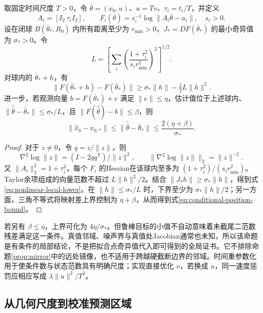 \begin{proposition}[含曲率条件的局部非线性误差界]
\label{prop:local-bound}
取固定时间尺度 $T>0$，令 $\bar\theta=(x_0,u)$、$u=Tv$、$\tau_i=t_i/T$，并定义
\[
 A_i=[I_2\ \tau_i I_2],\qquad
 F_i(\bar\theta)=s_i^{-1}\log\|A_i\bar\theta-a_i\|,
 \quad s_i>0.
\]
设在闭球 $B(\bar\theta_*,R_0)$ 内所有距离至少为 $r_{\min}>0$，$J_*=DF(\bar\theta_*)$ 的最小奇异值为 $\sigma_*>0$。令
\begin{equation}
 L=\left[\sum_i\left(\frac{1+\tau_i^2}{s_i r_{\min}^2}\right)^2\right]^{1/2}.
\end{equation}
对球内的 $\bar\theta_*+h$，有
\begin{equation}
 \|F(\bar\theta_*+h)-F(\bar\theta_*)\|
 \geq\sigma_*\|h\|-\tfrac12L\|h\|^2.
 \label{eq:nonlinear-local-lower}
\end{equation}
进一步，若观测向量 $b=F(\bar\theta_*)+e$ 满足 $\|e\|\leq\eta$，估计值位于上述球内、$\|\widehat{\bar\theta}-\bar\theta_*\|\leq\sigma_*/L$，且 $\|F(\widehat{\bar\theta})-b\|\leq\beta$，则
\begin{equation}
 \|\widehat x_0-x_{0,*}\|
 \leq\|\widehat{\bar\theta}-\bar\theta_*\|
 \leq\frac{2(\eta+\beta)}{\sigma_*}.
 \label{eq:conditional-position-bound}
\end{equation}
\end{proposition}

\begin{proof}
对于 $z\ne0$，令 $q=z/\|z\|$，则
\[
 \nabla^2\log\|z\|=(I-2qq^{\mathsf T})/\|z\|^2,
 \qquad \|\nabla^2\log\|z\|\|_2=\|z\|^{-2}.
\]
又 $\|A_i\|_2^2=1+\tau_i^2$，每个 $F_i$ 的Hessian在该球内至多为 $(1+\tau_i^2)/(s_i r_{\min}^2)$。Taylor余项组成的向量范数不超过 $L\|h\|^2/2$。结合 $\|J_*h\|\geq\sigma_*\|h\|$，得到式\eqref{eq:nonlinear-local-lower}。在 $\|h\|\leq\sigma_*/L$ 时，下界至少为 $\sigma_*\|h\|/2$；另一方面，三角不等式将映射差上界控制为 $\eta+\beta$，从而得到式\eqref{eq:conditional-position-bound}。
\end{proof}

若另有 $\beta\leq\eta$，上界可化为 $4\eta/\sigma_*$。但鲁棒目标的小值不自动意味着未截尾二范数残差满足这一条件。真值邻域、噪声界与真值处Jacobian通常也未知，所以该命题是有条件的局部结论，不是把拟合点奇异值代入即可得到的全局证书。它不排除命题\ref{prop:mirror}中的远处镜像，也不适用于跨越硬截断边界的邻域。时间重参数化用于使条件数与状态范数具有明确尺度；实现直接优化 $v$，若换成 $u$，同一速度惩罚应相应写成 $\lambda\|u\|^2/T^2$。

\subsection{从几何尺度到校准预测区域}

